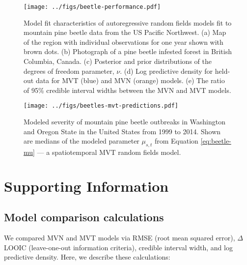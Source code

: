\documentclass[12pt,english]{article}
\begin{document}
\begin{spacing}{1.3}
\begin{figure}[htb]
  \begin{center}
    \texttt{[image: ../figs/beetle-performance.pdf]}
    \caption{
      Model fit characteristics of autoregressive random fields
      models fit to mountain pine beetle data from the US Pacific Northwest.
      (a) Map of the region with individual observations for one year shown with
      brown dots.
      (b) Photograph of a pine beetle infested forest in British Columbia, Canada.
      (c) Posterior and prior distributions of the degrees of freedom parameter, $\nu$.
      (d) Log predictive density for held-out data for MVT (blue) and MVN (orange) models.
      (e) The ratio of 95\% credible interval widths between the MVN and MVT models.
    }
    \label{fig:map-etc}
  \end{center}
\end{figure}

\clearpage

\begin{figure}[htb]
  \begin{center}
    \texttt{[image: ../figs/beetles-mvt-predictions.pdf]}
    \caption{Modeled severity of mountain pine beetle outbreaks in Washington and
      Oregon State in the United States from 1999 to 2014.
      Shown are medians of the modeled parameter $\mu_{s,t}$ from Equation \ref{eq:beetle-mu}
      --- a spatiotemporal MVT random fields model.
    }
    \label{fig:beetle-pred}
  \end{center}
\end{figure}


\end{spacing}

\clearpage

\section{Supporting Information}

\subsection{Model comparison calculations}

We compared MVN and MVT models via RMSE (root mean squared error), $\Delta$
LOOIC (leave-one-out information criteria), credible interval width,
and log predictive density. Here, we describe these calculations:
\end{document}
